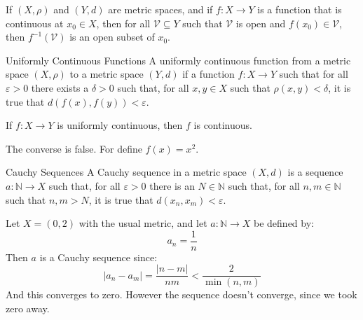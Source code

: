 \documentclass[crop=false,class=article,oneside]{standalone}
\begin{document}
            \begin{theorem}
                If $(X,\rho)$ and $(Y,d)$ are metric spaces, and if
                $f:X\rightarrow{Y}$ is a function that is continuous
                at $x_{0}\in{X}$, then for
                all $\mathcal{V}\subseteq{Y}$ such that $\mathcal{V}$ is
                open and $f(x_{0})\in\mathcal{V}$, then
                $f^{-1}(\mathcal{V})$ is an open subset of $x_{0}$.
            \end{theorem}
            \begin{ldefinition}{Uniformly Continuous Functions}
                A uniformly continuous function from a metric space
                $(X,\rho)$ to a metric space $(Y,d)$ if a function
                $f:X\rightarrow{Y}$ such that for all $\varepsilon>0$
                there exists a $\delta>0$ such that, for all $x,y\in{X}$
                such that $\rho(x,y)<\delta$, it is true that
                $d(f(x),f(y))<\varepsilon$.
            \end{ldefinition}
            \begin{theorem}
                If $f:X\rightarrow{Y}$ is uniformly continuous, then
                $f$ is continuous.
            \end{theorem}
            The converse is false. For define $f(x)=x^{2}$.
            \begin{ldefinition}{Cauchy Sequences}
                A Cauchy sequence in a metric space $(X,d)$ is a
                sequence $a:\mathbb{N}\rightarrow{X}$ such that, for
                all $\varepsilon>0$ there is an $N\in\mathbb{N}$ such
                that, for all $n,m\in\mathbb{N}$ such that $n,m>N$,
                it is true that $d(x_{n},x_{m})<\varepsilon$.
            \end{ldefinition}
            \begin{lexample}
                Let $X=(0,2)$ with the usual metric, and let
                $a:\mathbb{N}\rightarrow{X}$ be defined by:
                \begin{equation}
                    a_{n}=\frac{1}{n}
                \end{equation}
                Then $a$ is a Cauchy sequence since:
                \begin{equation}
                    |a_{n}-a_{m}|=\frac{|n-m|}{nm}
                    <\frac{2}{\min(n,m)}
                \end{equation}
                And this converges to zero. However the sequence
                doesn't converge, since we took zero away.
            \end{lexample}
\end{document}
